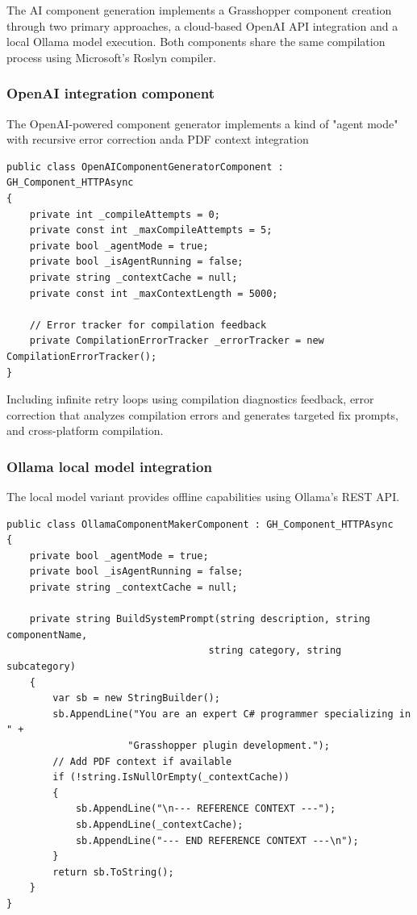 The AI component generation implements a Grasshopper component creation through two primary approaches, a cloud-based OpenAI API integration and a local Ollama model execution. Both components share the same compilation process using Microsoft's Roslyn compiler.

\subsubsection{OpenAI integration component}

The OpenAI-powered component generator implements a kind of "agent mode" with recursive error correction anda PDF context integration

\begin{verbatim}
public class OpenAIComponentGeneratorComponent : GH_Component_HTTPAsync
{
    private int _compileAttempts = 0;
    private const int _maxCompileAttempts = 5;
    private bool _agentMode = true;
    private bool _isAgentRunning = false;
    private string _contextCache = null;
    private const int _maxContextLength = 5000;
    
    // Error tracker for compilation feedback
    private CompilationErrorTracker _errorTracker = new CompilationErrorTracker();
}
\end{verbatim}

Including infinite retry loops using compilation diagnostics feedback, error correction that analyzes compilation errors and generates targeted fix prompts, and cross-platform compilation.

\subsubsection{Ollama local model integration}

The local model variant provides offline capabilities using Ollama's REST API.

\begin{verbatim}
public class OllamaComponentMakerComponent : GH_Component_HTTPAsync
{
    private bool _agentMode = true;
    private bool _isAgentRunning = false;
    private string _contextCache = null;
    
    private string BuildSystemPrompt(string description, string componentName, 
                                   string category, string subcategory)
    {
        var sb = new StringBuilder();
        sb.AppendLine("You are an expert C# programmer specializing in " +
                     "Grasshopper plugin development.");
        // Add PDF context if available
        if (!string.IsNullOrEmpty(_contextCache))
        {
            sb.AppendLine("\n--- REFERENCE CONTEXT ---");
            sb.AppendLine(_contextCache);
            sb.AppendLine("--- END REFERENCE CONTEXT ---\n");
        }
        return sb.ToString();
    }
}
\end{verbatim}

